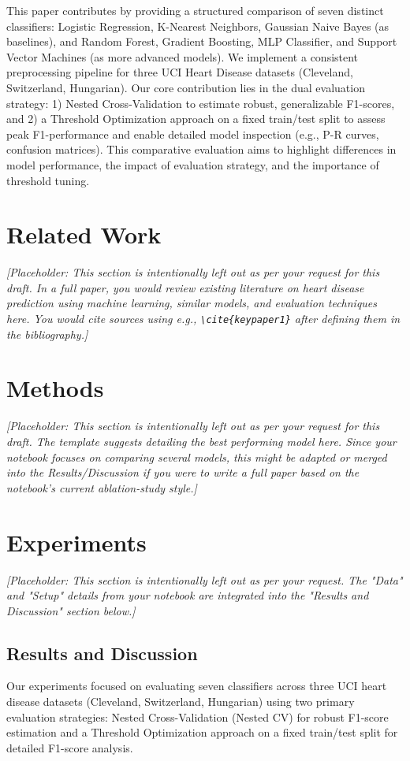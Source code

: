\documentclass{article}
\begin{document}
This paper contributes by providing a structured comparison of seven distinct classifiers: Logistic Regression, K-Nearest Neighbors, Gaussian Naive Bayes (as baselines), and Random Forest, Gradient Boosting, MLP Classifier, and Support Vector Machines (as more advanced models). We implement a consistent preprocessing pipeline for three UCI Heart Disease datasets (Cleveland, Switzerland, Hungarian). Our core contribution lies in the dual evaluation strategy: 1) Nested Cross-Validation to estimate robust, generalizable F1-scores, and 2) a Threshold Optimization approach on a fixed train/test split to assess peak F1-performance and enable detailed model inspection (e.g., P-R curves, confusion matrices). This comparative evaluation aims to highlight differences in model performance, the impact of evaluation strategy, and the importance of threshold tuning.

\section{Related Work}
\textit{[Placeholder: This section is intentionally left out as per your request for this draft. In a full paper, you would review existing literature on heart disease prediction using machine learning, similar models, and evaluation techniques here. You would cite sources using e.g., \texttt{\textbackslash cite\{keypaper1\}} after defining them in the bibliography.]}

\section{Methods}
\textit{[Placeholder: This section is intentionally left out as per your request for this draft. The template suggests detailing the best performing model here. Since your notebook focuses on comparing several models, this might be adapted or merged into the Results/Discussion if you were to write a full paper based on the notebook's current ablation-study style.]}

\section{Experiments}
\textit{[Placeholder: This section is intentionally left out as per your request. The "Data" and "Setup" details from your notebook are integrated into the "Results and Discussion" section below.]}

\subsection{Results and Discussion}
Our experiments focused on evaluating seven classifiers across three UCI heart disease datasets (Cleveland, Switzerland, Hungarian) using two primary evaluation strategies: Nested Cross-Validation (Nested CV) for robust F1-score estimation and a Threshold Optimization approach on a fixed train/test split for detailed F1-score analysis.
\end{document}
